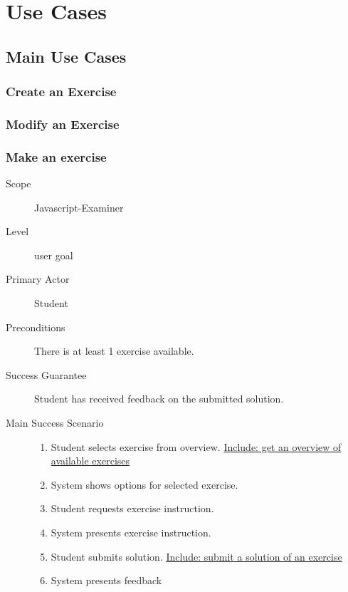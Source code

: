 \documentclass{article}
\begin{document}
\section{Use Cases}
\subsection{Main Use Cases}

\subsubsection{Create an Exercise}

\subsubsection{Modify an Exercise}

\subsubsection{Make an exercise}
\begin{mdframed} [rightmargin=-100pt]
\begin{description}
  \item[Scope] Javascript-Examiner
  \item[Level] user goal
  \item[Primary Actor] Student
  \item[Preconditions] There is at least 1 exercise available.
  \item[Success Guarantee] Student has received feedback on the submitted 
	solution.
  \item[Main Success Scenario] \mbox{}
	\begin{enumerate}
	  \item Student selects exercise from overview. \underline{Include: get
        an overview of available exercises}
	  \item System shows options for selected exercise.
	  \item Student requests exercise instruction.
	  \item System presents exercise instruction.
	  \item Student submits solution. \underline{Include: submit a solution of 
	    an exercise}
	  \item System presents feedback
	\end{enumerate}
\end{description}
\end{mdframed}
\end{document}

